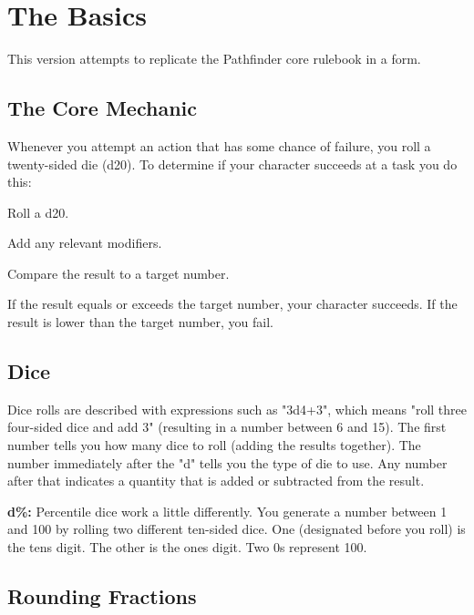\chapter{The Basics}\label{chapter:Basics}

This version attempts to replicate the Pathfinder core rulebook in a \latex form.
\section{The Core Mechanic}
Whenever you attempt an action that has some chance 
of failure, you roll a twenty-sided die (d20). To determine if your character succeeds 
at a task you do this:
\begin{itemize*}
\item Roll a d20.
\item Add any relevant modifiers.
\item Compare the result to a target number.
\end{itemize*}
If the result equals or exceeds the target number, your character succeeds. If 
the result is lower than the target number, you fail.

\section{Dice}

Dice rolls are described with expressions such as "3d4+3", which means "roll 
three four-sided dice and add 3" (resulting in a number between 6 and 15). The 
first number tells you how many dice to roll (adding the results together). The 
number immediately after the "d" tells you the type of die to use. Any number 
after that indicates a quantity that is added or subtracted from the result.

\textbf{d\%:} Percentile dice work a little differently. You generate a number 
between 1 and 100 by rolling two different ten-sided dice. One (designated before 
you roll) is the tens digit. The other is the ones digit. Two 0s represent 100.

\section{Rounding Fractions}

